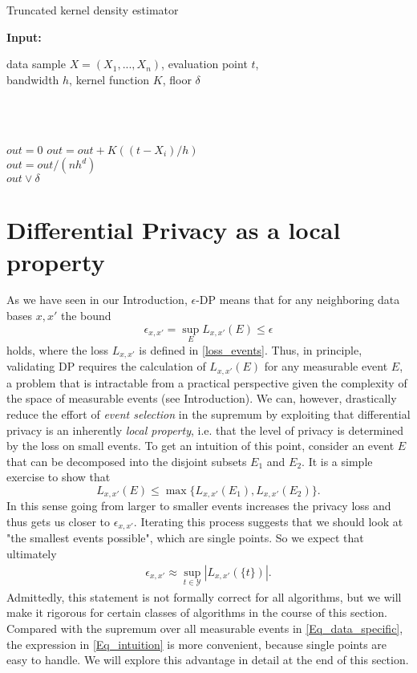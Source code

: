 \documentclass[conference]{IEEEtran}
\renewcommand{\algorithmicrequire}{\textbf{Input:}}
\begin{document}
\begin{algorithm}
	\caption{Truncated kernel density estimator} \label{alg}
	\small
	\algorithmicrequire \; \parbox[t]{\dimexpr\linewidth-\algorithmicindent}{
           data sample $X=(X_1,...,X_n)$, evaluation point $t$, \\ bandwidth $h$, kernel function $K$, floor $\delta$
        } \\
	\begin{algorithmic}[1]
	\\
	    $out = 0$
				\State $out = out+ K((t-X_i)/h)$
		\EndFor \\
	$out = out/(n h^d)$\\
		\Return $out \lor \delta$
	\EndFunction
	\end{algorithmic} 
\end{algorithm}






\section{Differential Privacy as a local property} \label{Sec_3}

As we have seen in our Introduction, $\epsilon$-DP means that for any neighboring data bases $x,x'$ the bound
\begin{equation} \label{Eq_data_specific}
\epsilon_{x,x'}=
\sup_E L_{x,x'}(E) 
\le \epsilon
\end{equation}
holds, where the loss $L_{x,x'}$ 
is 
defined in \eqref{loss_events}. 
Thus, in principle, validating DP requires the calculation of $L_{x,x'}(E)$ for any measurable event $E$, a problem that is intractable from a practical perspective  given the complexity of the space of measurable events (see Introduction). 
We can, however, drastically reduce the effort of \textit{event selection} in the supremum by exploiting that differential privacy is an inherently \textit{local property}, i.e. that the level of privacy is determined by the loss on small events.
To get an intuition of this point, consider an event $E$ that can be decomposed into the disjoint subsets $E_1$ and $E_2.$ It is a simple exercise to show that
$$
L_{x,x'}(E) \le \max \{L_{x,x'}(E_1), L_{x,x'}(E_2)\}.
$$
In this sense going from larger to smaller events increases the privacy loss and thus gets us closer to $\epsilon_{x,x'}$. Iterating this process suggests that we should look at "the smallest events possible", which are single points. So we expect that ultimately
\begin{align} \label{Eq_intuition}
\epsilon_{x,x'} \approx \sup_{t \in \mathcal{Y}}|L_{x,x'}(\{t\})|.
\end{align}
Admittedly, this statement is not formally correct for all algorithms, but we will make it rigorous for certain classes of algorithms in the course of this section. Compared with the supremum over all measurable events in \eqref{Eq_data_specific}, the expression in \eqref{Eq_intuition} is more convenient, because single points are easy to handle. We will explore this advantage in detail at the end of this section. \\
\end{document}

